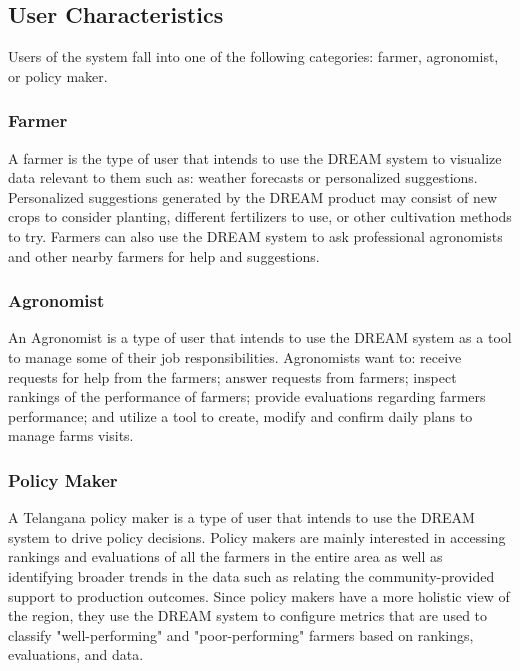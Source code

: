 \subsection{User Characteristics}
\begin{flushleft}
Users of the system fall into one of the following categories: farmer, agronomist, or policy maker.
\subsubsection{Farmer}
A farmer is the type of user that intends to use the DREAM system to visualize data relevant to them such as: weather forecasts or personalized suggestions. Personalized suggestions generated by the DREAM product may consist of new crops to consider planting, different fertilizers to use, or other cultivation methods to try. Farmers can also use the DREAM system to ask professional agronomists and other nearby farmers for help and suggestions.\\
\subsubsection{Agronomist}
An Agronomist is a type of user that intends to use the DREAM system as a tool to manage some of their job responsibilities. Agronomists want to: receive requests for help from the farmers; answer requests from farmers; inspect rankings of the performance of farmers; provide evaluations regarding farmers performance; and utilize a tool to create, modify and confirm daily plans to manage farms visits.
\subsubsection{Policy Maker}
A Telangana policy maker is a type of user that intends to use the DREAM system to drive policy decisions. Policy makers are mainly interested in accessing rankings and evaluations of all the farmers in the entire area as well as identifying broader trends in the data such as relating the community-provided support to production outcomes. Since policy makers have a more holistic view of the region, they use the DREAM system to configure metrics that are used to classify "well-performing" and "poor-performing" farmers based on rankings, evaluations, and data.\\
\end{flushleft}



